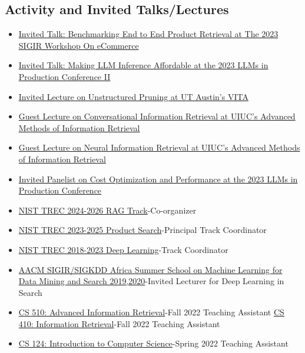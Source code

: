 \documentclass[line,margin]{res}
\begin{document}
\begin{resume}
\subsection{Activity and Invited Talks/Lectures}
\begin{itemize} 
\item \href{https://sigir-ecom.github.io/ecom2023/index.html}{Invited Talk: Benchmarking End to End Product Retrieval at The 2023 SIGIR Workshop On eCommerce}
\item \href{https://home.mlops.community/public/events/llm-in-prod-part-ii-2023-06-20}{Invited Talk: Making LLM Inference Affordable at the 2023 LLMs in Production Conference II}
\item \href{https://vita-group.github.io/group.html}{Invited Lecture on Unstructured Pruning at UT Austin's VITA} 
\item \href{https://courses.grainger.illinois.edu/cs510/sp2023/}{Guest Lecture on Conversational Information Retrieval at UIUC's Advanced Methods of Information Retrieval} 
\item \href{https://courses.grainger.illinois.edu/cs510/sp2023/}{Guest Lecture on Neural Information Retrieval at UIUC's Advanced Methods of Information Retrieval} 
\item \href{https://home.mlops.community/public/events/llms-in-production-conference-2023-04-13}{Invited Panelist on Cost Optimization and Performance at the 2023 LLMs in Production Conference}
\item  \href{https://trec-rag.github.io/}{NIST TREC 2024-2026 RAG Track}-Co-organizer
\item  \href{https://trec.nist.gov/pubs/call2020.html}{NIST TREC 2023-2025 Product Search}-Principal Track Coordinator
\item  \href{https://trec.nist.gov/pubs/call2020.html}{NIST TREC 2018-2023 Deep Learning}-Track Coordinator
\item \href{http://sigir.org/afirm2020/}{AACM SIGIR/SIGKDD Africa Summer School on Machine Learning for Data Mining and Search 2019,2020}-Invited Lecturer for Deep Learning in Search
\item  
\href{https://cs.illinois.edu/academics/courses/cs510}{CS 510: Advanced Information Retrieval}-Fall 2022 Teaching Assistant 
\href{https://cs.illinois.edu/academics/courses/cs410}{CS 410: Information Retrieval}-Fall 2022 Teaching Assistant 
\item  
\href{https://cs.illinois.edu/academics/courses/cs124}{CS 124: Introduction to Computer Science}-Spring 2022 Teaching Assistant
\end{itemize}
\end{resume}
\end{document}
